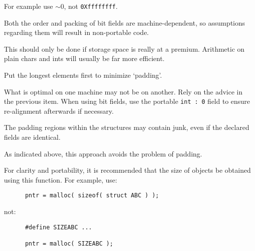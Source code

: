 
For example use {\tt$\sim0$}, not {\tt 0Xffffffff}.



Both the order and packing of bit fields are machine-dependent, so 
assumptions regarding them will result in non-portable code.


This should only be done  if storage space is 
really at a premium. Arithmetic on plain chars and ints will usually be far
more efficient.


Put the longest elements first to minimize `padding'.


What is optimal on one machine may not be on another. Rely 
on the advice in the previous item.
When using bit fields, use the portable {\tt int~:~0}
field to ensure re-alignment afterwards if necessary.




The padding regions within the structures may 
contain junk, even if the declared fields are identical.


As indicated above, this approach avoids the problem of padding.


For clarity and portability, it is recommended that the size of objects be
obtained using this function.
For example, use:
\begin{verbatim}
      pntr = malloc( sizeof( struct ABC ) );
\end{verbatim}
not:
\begin{verbatim}
      #define SIZEABC ...

      pntr = malloc( SIZEABC );
\end{verbatim}


